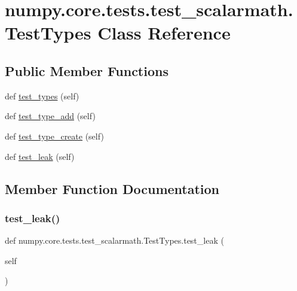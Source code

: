 \hypertarget{classnumpy_1_1core_1_1tests_1_1test__scalarmath_1_1TestTypes}{}\section{numpy.\+core.\+tests.\+test\+\_\+scalarmath.\+Test\+Types Class Reference}
\label{classnumpy_1_1core_1_1tests_1_1test__scalarmath_1_1TestTypes}
\subsection*{Public Member Functions}
\begin{DoxyCompactItemize}
\item 
def \hyperlink{classnumpy_1_1core_1_1tests_1_1test__scalarmath_1_1TestTypes_aeb4393427979c4ca19e198848ddc2050}{test\+\_\+types} (self)
\item 
def \hyperlink{classnumpy_1_1core_1_1tests_1_1test__scalarmath_1_1TestTypes_acbb99d98b5652f0a95c1b75792c14d41}{test\+\_\+type\+\_\+add} (self)
\item 
def \hyperlink{classnumpy_1_1core_1_1tests_1_1test__scalarmath_1_1TestTypes_affe82dbc907e0910b116ff66279860dc}{test\+\_\+type\+\_\+create} (self)
\item 
def \hyperlink{classnumpy_1_1core_1_1tests_1_1test__scalarmath_1_1TestTypes_ac77e7e76a85fa0a273335ab63630fc10}{test\+\_\+leak} (self)
\end{DoxyCompactItemize}


\subsection{Member Function Documentation}
\mbox{\label{classnumpy_1_1core_1_1tests_1_1test__scalarmath_1_1TestTypes_ac77e7e76a85fa0a273335ab63630fc10}} 
\subsubsection{\texorpdfstring{test\+\_\+leak()}{test\_leak()}}
{\footnotesize\ttfamily def numpy.\+core.\+tests.\+test\+\_\+scalarmath.\+Test\+Types.\+test\+\_\+leak (\begin{DoxyParamCaption}\item[{}]{self }\end{DoxyParamCaption})}

